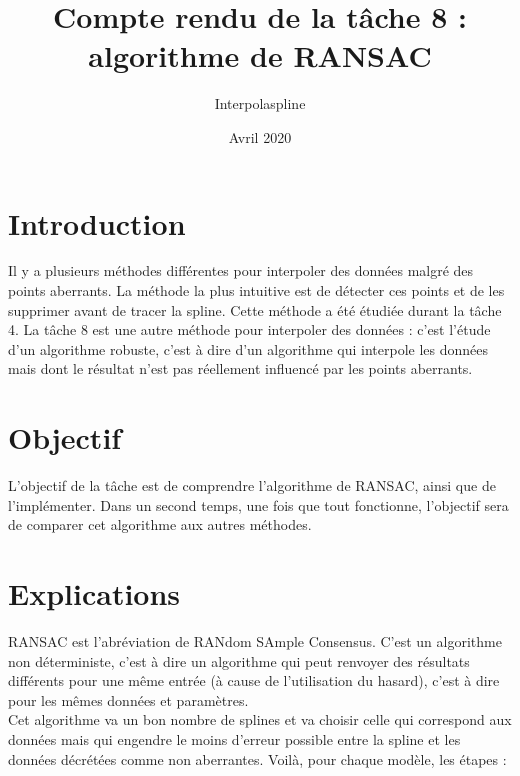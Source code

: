 \documentclass[a4paper,12pt]{article} %
\title{Compte rendu de la tâche 8 : algorithme de RANSAC}
\author{Interpolaspline}
\date{Avril 2020}
\begin{document}
\maketitle

\section{Introduction}

Il y a plusieurs méthodes différentes pour interpoler des données malgré des points aberrants. La méthode la plus intuitive est de détecter ces points et de les supprimer avant de tracer la spline. Cette méthode a été étudiée durant la tâche 4. La tâche 8 est une autre méthode pour interpoler des données : c'est l'étude d'un algorithme robuste, c'est à dire d'un algorithme qui interpole les données mais dont le résultat n'est pas réellement influencé par les points aberrants.

\section{Objectif}

L'objectif de la tâche est de comprendre l'algorithme de RANSAC, ainsi que de l'implémenter. Dans un second temps, une fois que tout fonctionne, l'objectif sera de comparer cet algorithme aux autres méthodes.

\section{Explications}
RANSAC est l'abréviation de RANdom SAmple Consensus. C'est un algorithme non déterministe, c'est à dire un algorithme qui peut renvoyer des résultats différents pour une même entrée (à cause de l'utilisation du hasard), c'est à dire pour les mêmes données et paramètres.\\
Cet algorithme va un bon nombre de splines et va choisir celle qui correspond aux données mais qui engendre le moins d'erreur possible entre la spline et les données décrétées comme non aberrantes. Voilà, pour chaque modèle, les étapes :\\
\end{document}
